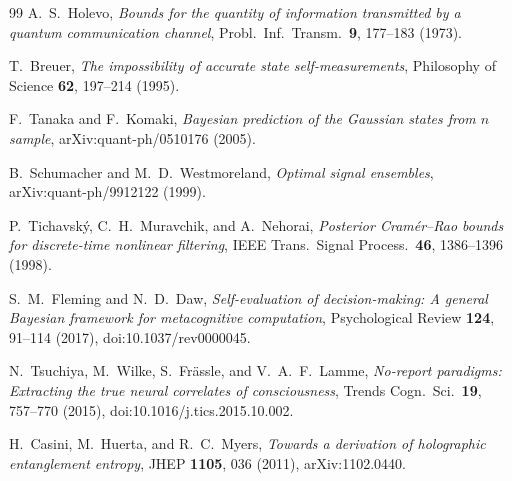 \documentclass[12pt]{article}
\theoremstyle{definition}
\theoremstyle{remark}
\begin{document}
\begin{thebibliography}{99}
A.~S.~Holevo,
\emph{Bounds for the quantity of information transmitted by a quantum communication channel},
Probl.\ Inf.\ Transm.\ \textbf{9}, 177--183 (1973).

T.~Breuer,
\emph{The impossibility of accurate state self-measurements},
Philosophy of Science \textbf{62}, 197--214 (1995).

F.~Tanaka and F.~Komaki,
\emph{Bayesian prediction of the Gaussian states from $n$ sample},
arXiv:quant-ph/0510176 (2005).

B.~Schumacher and M.~D.~Westmoreland,
\emph{Optimal signal ensembles},
arXiv:quant-ph/9912122 (1999).

P.~Tichavsk\'y, C.~H.~Muravchik, and A.~Nehorai,
\emph{Posterior Cram\'er--Rao bounds for discrete-time nonlinear filtering},
IEEE Trans.\ Signal Process.\ \textbf{46}, 1386--1396 (1998).

S.~M.~Fleming and N.~D.~Daw,
\emph{Self-evaluation of decision-making: A general Bayesian framework for metacognitive computation},
Psychological Review \textbf{124}, 91--114 (2017),
doi:10.1037/rev0000045.

N.~Tsuchiya, M.~Wilke, S.~Fr\"assle, and V.~A.~F.~Lamme,
\emph{No-report paradigms: Extracting the true neural correlates of consciousness},
Trends Cogn.\ Sci.\ \textbf{19}, 757--770 (2015),
doi:10.1016/j.tics.2015.10.002.

H.~Casini, M.~Huerta, and R.~C.~Myers,
\emph{Towards a derivation of holographic entanglement entropy},
JHEP \textbf{1105}, 036 (2011),
arXiv:1102.0440.

\end{thebibliography}
\end{document}
